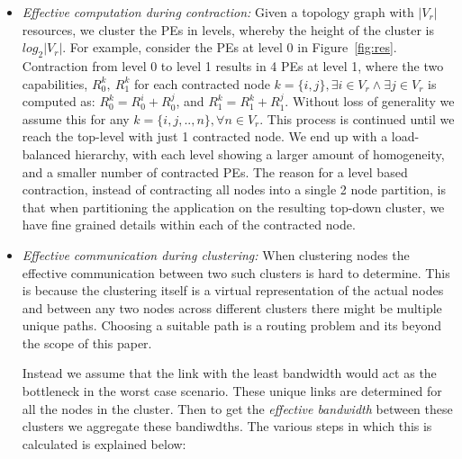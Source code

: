 \begin{itemize}

\item \textit{Effective computation during contraction:} Given a
  topology graph with $|V_r|$ resources, we cluster the PEs in levels,
  whereby the height of the cluster is $log_2|V_r|$. For example,
  consider the PEs at level 0 in Figure~\ref{fig:res}. Contraction from
  level 0 to level 1 results in 4 PEs at level 1, where the two
  capabilities, $R^k_0,\ R^k_1$ for each contracted node $k = \{i, j\},
  \exists i \in V_r \wedge \exists j \in V_r$ is computed as: $R^k_0 =
  R^i_0 + R^j_0$, and $R^k_1 = R^k_1 + R^j_1$. Without loss of
  generality we assume this for any $k = \{i,j,..,n\}, \forall n \in
  V_r$. This process is continued until we reach the top-level with just
  1 contracted node. We end up with a load-balanced hierarchy, with each
  level showing a larger amount of homogeneity, and a smaller number of
  contracted PEs. The reason for a level based contraction, instead of
  contracting all nodes into a single 2 node partition, is that when
  partitioning the application on the resulting top-down cluster, we
  have fine grained details within each of the contracted node.



\item \textit{Effective communication during clustering:}
  When clustering nodes the effective communication between two such clusters is
  hard to determine. This is because the clustering itself is a virtual
  representation of the actual nodes and between any two nodes across different
  clusters there might be multiple unique paths. Choosing a suitable path is a routing
  problem and its beyond the scope of this paper.

  Instead we assume that the link with the least bandwidth would act as the
  bottleneck in the worst case scenario. These unique links are determined
  for all the nodes in the cluster. Then to get the \textit{effective
  bandwidth} between these clusters we aggregate these bandiwdths.
  The various steps in which this is calculated is explained below:


\end{itemize}
